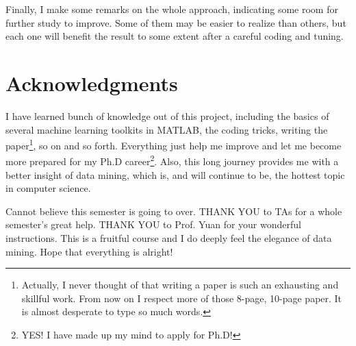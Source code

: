 \documentclass{sig-alternate}
\begin{document}
Finally, I make some remarks on the whole approach, indicating some room for further study to improve. Some of them may be easier to realize than others, but each one will benefit the result to some extent after a careful coding and tuning.

\section{Acknowledgments}
I have learned bunch of knowledge out of this project, including the basics of several machine learning toolkits in MATLAB, the coding tricks, writing the paper\footnote{Actually, I never thought of that writing a paper is such an exhausting and skillful work. From now on I respect more of those 8-page, 10-page paper. It is almost desperate to type so much words.}, so on and so forth. Everything just help me improve and let me become more prepared for my Ph.D career\footnote{YES! I have made up my mind to apply for Ph.D!}. Also, this long journey provides me with a better insight of data mining, which is, and will continue to be, the hottest topic in computer science.

Cannot believe this semester is going to over.  THANK YOU to TAs for a whole semester's great help. THANK YOU to Prof. Yuan for your wonderful instructions. This is a fruitful course and I do deeply feel the elegance of data mining. Hope that everything is alright!

%

%
%
\end{document}
